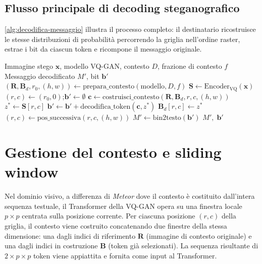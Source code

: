 \subsection{Flusso principale di decoding steganografico}

\autoref{alg:decodifica-messaggio} illustra il processo completo: il destinatario ricostruisce le stesse distribuzioni di probabilità percorrendo la griglia nell'ordine raster, estrae i bit da ciascun token e ricompone il messaggio originale.

\begin{algorithm}[htbp]
\caption{Decodifica steganografica del messaggio dall'immagine}
\label{alg:decodifica-messaggio}
\begin{algorithmic}[1]
\Require Immagine stego $\mathbf{x}$, modello VQ-GAN, contesto $D$, frazione di contesto $f$
\Ensure Messaggio decodificato $M'$, bit $\mathbf{b}'$
\State $(\mathbf{R}, \mathbf{B}_d, r_0, (h,w)) \gets \mathrm{prepara\_contesto}(\mathrm{modello}, D, f)$
\State $\mathbf{S} \gets \mathrm{Encoder_{VQ}}(\mathbf{x})$ 
\State $(r, c) \gets (r_0, 0)$;\quad $\mathbf{b}' \gets \emptyset$
\State $\mathbf{c} \gets \mathrm{costruisci\_contesto}(\mathbf{R}, \mathbf{B}_d, r, c, (h,w))$
\State $z^* \gets \mathbf{S}[r, c]$ 
\State $\mathbf{b}' \gets \mathbf{b}' + \mathrm{decodifica\_token}(\mathbf{c}, z^*)$
\State $\mathbf{B}_d[r, c] \gets z^*$
\State $(r, c) \gets \mathrm{pos\_successiva}(r, c, (h,w))$
\EndWhile
\State $M' \gets \mathrm{bin2testo}(\mathbf{b}')$
\State \Return $M',\; \mathbf{b}'$
\end{algorithmic}
\end{algorithm}

\section{Gestione del contesto e sliding window}
\label{sec:gestione-contesto}

Nel dominio visivo, a differenza di \emph{Meteor} dove il contesto è costituito dall'intera sequenza testuale, il Transformer della VQ-GAN opera su una finestra locale $p \times p$ centrata sulla posizione corrente. Per ciascuna posizione $(r, c)$ della griglia, il contesto viene costruito concatenando due finestre della stessa dimensione: una dagli indici di riferimento $\mathbf{R}$ (immagine di contesto originale) e una dagli indici in costruzione $\mathbf{B}$ (token già selezionati). La sequenza risultante di $2 \times p \times p$ token viene appiattita e fornita come input al Transformer.

